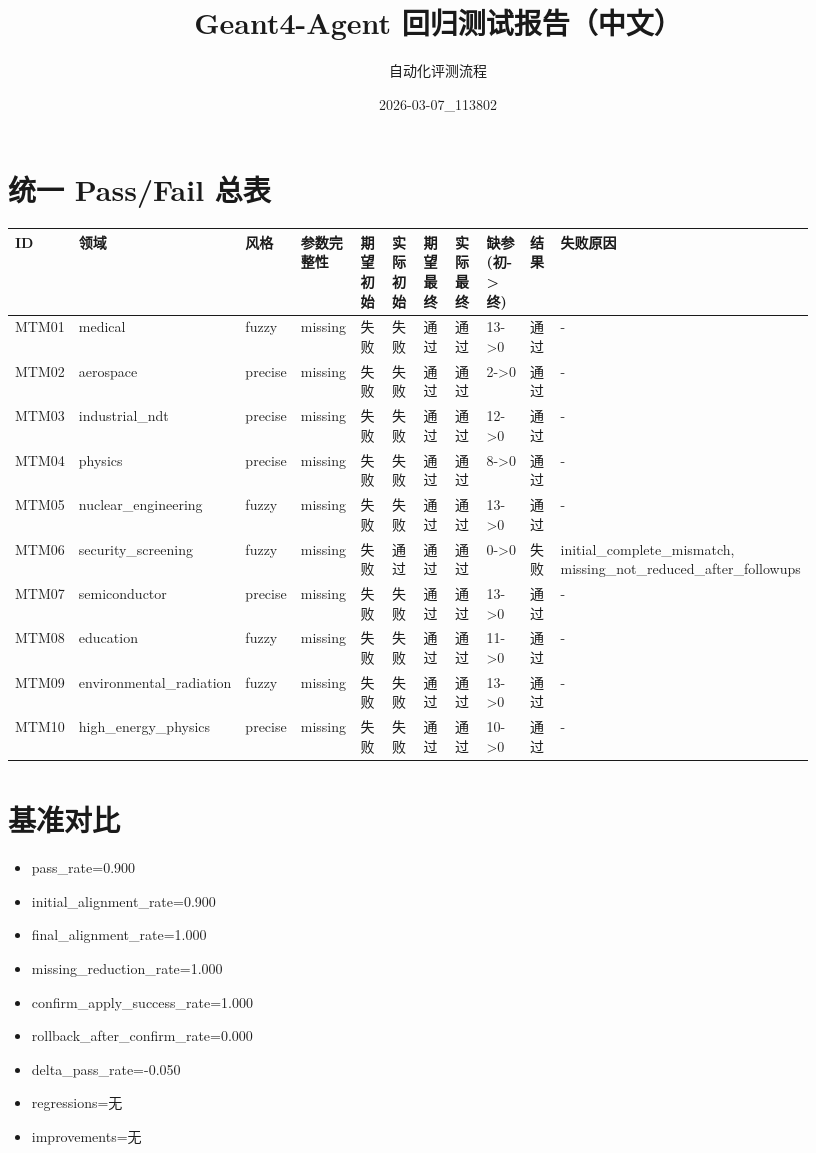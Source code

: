 \documentclass[11pt]{ctexart}
\title{Geant4-Agent 回归测试报告（中文）}
\author{自动化评测流程}
\date{2026-03-07\_113802}
\begin{document}
\maketitle
\section{统一 Pass/Fail 总表}
\begin{longtable}{p{0.06\linewidth}p{0.08\linewidth}p{0.07\linewidth}p{0.08\linewidth}p{0.07\linewidth}p{0.07\linewidth}p{0.07\linewidth}p{0.07\linewidth}p{0.09\linewidth}p{0.06\linewidth}p{0.21\linewidth}}
\toprule
ID & 领域 & 风格 & 参数完整性 & 期望初始 & 实际初始 & 期望最终 & 实际最终 & 缺参(初->终) & 结果 & 失败原因 \\
\midrule
MTM01 & medical & fuzzy & missing & 失败 & 失败 & 通过 & 通过 & 13->0 & 通过 & - \\
MTM02 & aerospace & precise & missing & 失败 & 失败 & 通过 & 通过 & 2->0 & 通过 & - \\
MTM03 & industrial\_ndt & precise & missing & 失败 & 失败 & 通过 & 通过 & 12->0 & 通过 & - \\
MTM04 & physics & precise & missing & 失败 & 失败 & 通过 & 通过 & 8->0 & 通过 & - \\
MTM05 & nuclear\_engineering & fuzzy & missing & 失败 & 失败 & 通过 & 通过 & 13->0 & 通过 & - \\
MTM06 & security\_screening & fuzzy & missing & 失败 & 通过 & 通过 & 通过 & 0->0 & 失败 & initial\_complete\_mismatch, missing\_not\_reduced\_after\_followups \\
MTM07 & semiconductor & precise & missing & 失败 & 失败 & 通过 & 通过 & 13->0 & 通过 & - \\
MTM08 & education & fuzzy & missing & 失败 & 失败 & 通过 & 通过 & 11->0 & 通过 & - \\
MTM09 & environmental\_radiation & fuzzy & missing & 失败 & 失败 & 通过 & 通过 & 13->0 & 通过 & - \\
MTM10 & high\_energy\_physics & precise & missing & 失败 & 失败 & 通过 & 通过 & 10->0 & 通过 & - \\
\bottomrule
\end{longtable}
\section{基准对比}
\begin{itemize}
\item pass\_rate=0.900
\item initial\_alignment\_rate=0.900
\item final\_alignment\_rate=1.000
\item missing\_reduction\_rate=1.000
\item confirm\_apply\_success\_rate=1.000
\item rollback\_after\_confirm\_rate=0.000
\item delta\_pass\_rate=-0.050
\item regressions=无
\item improvements=无
\end{itemize}
\appendix
\end{document}
